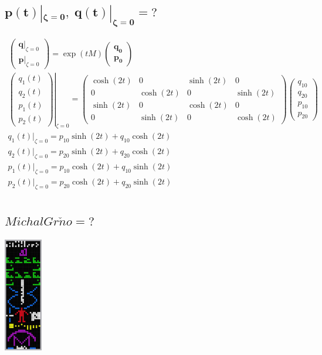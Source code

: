 \documentclass[10pt,a4paper]{article}
\newcommand{\mat}[1]{
    \begin{pmatrix}
        #1
    \end{pmatrix}
}
\begin{document}
\subsection{
    \texorpdfstring{
        $\pmb{ p(t)|_{\zeta=0}, \; q(t)|_{\zeta=0} = \mathit{?} }$
    }{
        p(t)|\{z=0\}, q(t)|\{z=0\} = ?
    }
}
\begin{gather*}
    \mat{
        \bm{q}|_{\zeta=0} \\ \bm{p}|_{\zeta=0}
    }
    =
    \exp(tM)
    \mat{
        \bm{q_0} \\ \bm{p_0}
    }
    \\[15pt]
    \left.
    \mat{
        q_1(t) \\ q_2(t) \\ p_1(t) \\ p_2(t)
    }
    \right|_{\zeta=0}
    =
    \mat{\cosh{\left(2 t \right)} & 0 & \sinh{\left(2 t \right)} & 0\\0 & \cosh{\left(2 t \right)} & 0 & \sinh{\left(2 t \right)}\\\sinh{\left(2 t \right)} & 0 & \cosh{\left(2 t \right)} & 0\\0 & \sinh{\left(2 t \right)} & 0 & \cosh{\left(2 t \right)}}
    \mat{
        q_{10} \\ q_{20} \\ p_{10} \\ p_{20}
    }
    \\[20pt]
    q_1(t)|_{\zeta=0} = p_{10} \sinh{\left(2 t \right)} + q_{10} \cosh{\left(2 t \right)}
    \\[5pt]
    q_2(t)|_{\zeta=0} = p_{20} \sinh{\left(2 t \right)} + q_{20} \cosh{\left(2 t \right)}
    \\[5pt]
    p_1(t)|_{\zeta=0} = p_{10} \cosh{\left(2 t \right)} + q_{10} \sinh{\left(2 t \right)}
    \\[5pt]
    p_2(t)|_{\zeta=0} = p_{20} \cosh{\left(2 t \right)} + q_{20} \sinh{\left(2 t \right)}
    \\[10pt]
\end{gather*}

\subsection{
    \texorpdfstring{
        $\pmb{ \mathit{Michal Gr\check{n}o} = \mathit{?} }$
    }{
        p(t)|\{z=0\}, q(t)|\{z=0\} = ?
    }
}
\centering
\includegraphics[height=5cm,keepaspectratio]{arecibo.png}
\end{document}

